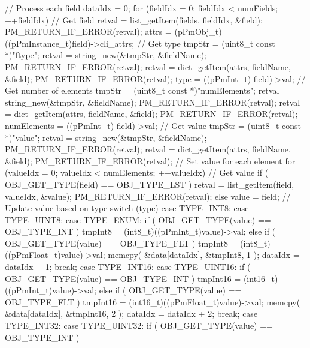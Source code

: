 \begin{DoxyVerb}
// Process each field
dataIdx = 0;
for (fieldIdx = 0; fieldIdx < numFields; ++fieldIdx)
{               
        // Get field
        retval = list_getItem(fields, fieldIdx, &field); PM_RETURN_IF_ERROR(retval);
        attrs = (pPmObj_t)((pPmInstance_t)field)->cli_attrs;
        // Get type
        tmpStr = (uint8_t const *)"ftype";
        retval = string_new(&tmpStr, &fieldName); PM_RETURN_IF_ERROR(retval); 
        retval = dict_getItem(attrs, fieldName, &field); PM_RETURN_IF_ERROR(retval);
        type = ((pPmInt_t) field)->val;   
        // Get number of elements
        tmpStr = (uint8_t const *)"numElements";
        retval = string_new(&tmpStr, &fieldName); PM_RETURN_IF_ERROR(retval); 
        retval = dict_getItem(attrs, fieldName, &field); PM_RETURN_IF_ERROR(retval);
        numElements = ((pPmInt_t) field)->val;
        // Get value
        tmpStr = (uint8_t const *)"value";
        retval = string_new(&tmpStr, &fieldName); PM_RETURN_IF_ERROR(retval); 
        retval = dict_getItem(attrs, fieldName, &field); PM_RETURN_IF_ERROR(retval); 
        // Set value for each element
        for (valueIdx = 0; valueIdx < numElements; ++valueIdx)
        {
// Get value
if ( OBJ_GET_TYPE(field) == OBJ_TYPE_LST )
{
        retval = list_getItem(field, valueIdx, &value); PM_RETURN_IF_ERROR(retval); 
}
else
        value = field;
// Update value based on type    
switch (type)  
{
        case TYPE_INT8: 
        case TYPE_UINT8:
        case TYPE_ENUM:       
                if ( OBJ_GET_TYPE(value) == OBJ_TYPE_INT )  
                {
                        tmpInt8 = (int8_t)((pPmInt_t)value)->val;
                }
                else if ( OBJ_GET_TYPE(value) == OBJ_TYPE_FLT )  
                {
                    tmpInt8 = (int8_t)((pPmFloat_t)value)->val;  
                } 
                memcpy( &data[dataIdx], &tmpInt8, 1 );
                dataIdx = dataIdx + 1;
                break;
        case TYPE_INT16:
        case TYPE_UINT16:
                if ( OBJ_GET_TYPE(value) == OBJ_TYPE_INT )  
                {
                        tmpInt16 = (int16_t)((pPmInt_t)value)->val;
                }
                else if ( OBJ_GET_TYPE(value) == OBJ_TYPE_FLT )  
                {
                    tmpInt16 = (int16_t)((pPmFloat_t)value)->val;  
                }                                       
                memcpy( &data[dataIdx], &tmpInt16, 2 );
                dataIdx = dataIdx + 2;
                break;       
        case TYPE_INT32:
        case TYPE_UINT32:
                if ( OBJ_GET_TYPE(value) == OBJ_TYPE_INT )  
                {
}}}}
\end{DoxyVerb}
